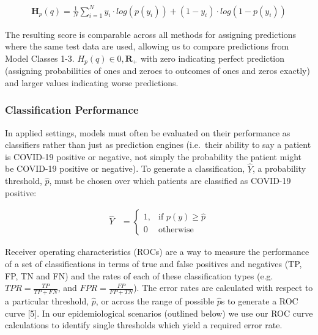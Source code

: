 \documentclass[]{elsarticle} %
\begin{document}
\begin{equation}\begin{aligned}
\boldsymbol{H}_p(q)=\frac{1}{N}\sum_{i=1}^{N}y_i\cdot log(p(y_i))+(1-y_i)\cdot log(1-p(y_i))
\label{eq:CrossEntropy}
\end{aligned}\end{equation}\ignorespacesafterend

The resulting score is comparable across all methods for assigning predictions where the same test data are used, allowing us to compare predictions from Model Classes 1-3.
\(H_p(q)\in {0,\boldsymbol{R}_+}\) with zero indicating perfect prediction (assigning probabilities of ones and zeroes to outcomes of ones and zeros exactly) and larger values indicating worse predictions.

\hypertarget{classification-performance}{%
\subsubsection{Classification Performance}\label{classification-performance}}

In applied settings, models must often be evaluated on their performance as classifiers rather than just as prediction engines (i.e.~their ability to say a patient is COVID-19 positive or negative, not simply the probability the patient might be COVID-19 positive or negative).
To generate a classification, \(\hat{Y}\), a probability threshold, \(\hat{p}\), must be chosen over which patients are classified as COVID-19 positive:

\begin{equation}\begin{aligned}
\hat{Y} &= \begin{cases}
    1,& \text{if } p(y) \geq \hat{p} \\
     0  & \text{otherwise}
\end{cases}
\label{eq:ClassificationThreshold}
\end{aligned}\end{equation}\ignorespacesafterend

Receiver operating characteristics (ROCs) are a way to measure the performance of a set of classifications in terms of true and false positives and negatives (TP, FP, TN and FN) and the rates of each of these classification types (e.g.~\(TPR = \frac{TP}{TP+FN}\), and \(FPR = \frac{FP}{FP+TN}\)).
The error rates are calculated with respect to a particular threshold, \(\hat{p}\), or across the range of possible \(\hat{p}\)s to generate a ROC curve {[}5{]}.
In our epidemiological scenarios (outlined below) we use our ROC curve calculations to identify single thresholds which yield a required error rate.
\end{document}
